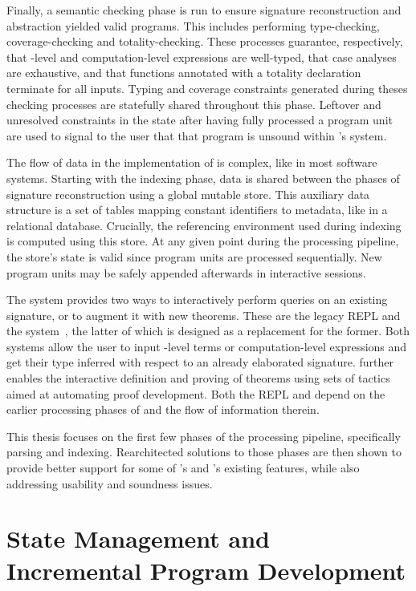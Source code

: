 Finally, a semantic checking phase is run to ensure signature reconstruction and abstraction yielded valid programs.
This includes performing type-checking, coverage-checking and totality-checking.
These processes guarantee, respectively, that \LF-level and computation-level expressions are well-typed, that case analyses are exhaustive, and that functions annotated with a totality declaration terminate for all inputs.
Typing and coverage constraints generated during theses checking processes are statefully shared throughout this phase.
Leftover and unresolved constraints in the state after having fully processed a program unit are used to signal to the user that that program is unsound within \Beluga's system.

The flow of data in the implementation of \Beluga is complex, like in most software systems.
Starting with the indexing phase, data is shared between the phases of signature reconstruction using a global mutable store.
This auxiliary data structure is a set of tables mapping constant identifiers to metadata, like in a relational database.
Crucially, the referencing environment used during indexing is computed using this store.
At any given point during the processing pipeline, the store's state is valid since program units are processed sequentially.
New program units may be safely appended afterwards in interactive sessions.

The \Beluga system provides two ways to interactively perform queries on an existing \Beluga signature, or to augment it with new theorems.
These are the legacy \ac{REPL} and the \Harpoon system~\cite{errington2021harpoon}, the latter of which is designed as a replacement for the former.
Both systems allow the user to input \LF-level terms or computation-level expressions and get their type inferred with respect to an already elaborated \Beluga signature.
\Harpoon further enables the interactive definition and proving of theorems using sets of tactics aimed at automating proof development.
Both the \ac{REPL} and \Harpoon depend on the earlier processing phases of \Beluga and the flow of information therein.

This thesis focuses on the first few phases of the \Beluga processing pipeline, specifically parsing and indexing.
Rearchitected solutions to those phases are then shown to provide better support for some of \Beluga's and \Harpoon's existing features, while also addressing usability and soundness issues.

\section{State Management and Incremental Program Development}\label{section:intro-state-management}

